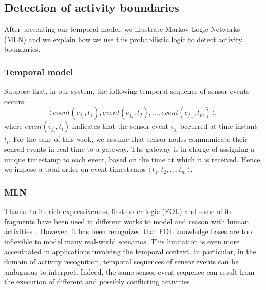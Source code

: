 \documentclass[10pt, conference, compsocconf]{IEEEtran}
\begin{document}
\subsection{Detection of activity boundaries}
After presenting our temporal model, we illustrate Markov Logic Networks (MLN)
and we explain how we use this probabilistic logic to detect activity boundaries. 

\subsubsection{Temporal model}
Suppose that, in our system, the following temporal sequence of sensor events occurs: 
\[
\langle \, event(e_{j_1}, t_1), event(e_{j_2}, t_2), \ldots, event(e_{j_m}, t_m) \, \rangle,
\]
where $event(e_{j_i},t_i)$ indicates that the sensor event $e_{j_i}$ occurred at time instant $t_i$. 
For the sake of this work, we assume that sensor nodes communicate their sensed events in 
real-time to a gateway. The gateway is in charge of assigning a unique timestamp to each event, 
based on the time at which it is received. 
Hence, we impose a total order on event timestamps $\langle \, t_1, t_2, \ldots, t_m \, \rangle$. 


\subsubsection{MLN}
\label{subsec:mln}
Thanks to its rich expressiveness, first-order logic (FOL) and some of its fragments have been used in different works to model and reason with human activities~\cite{RiboniPMC11}. However, it has been recognized that FOL knowledge bases are too inflexible to model many real-world scenarios. This limitation is even more accentuated in applications involving the temporal context. In particular, in the domain of activity recognition, temporal sequences of sensor events can be ambiguous to interpret. Indeed, the same sensor event sequence can result from the execution of different and possibly conflicting activities. 
\end{document}

